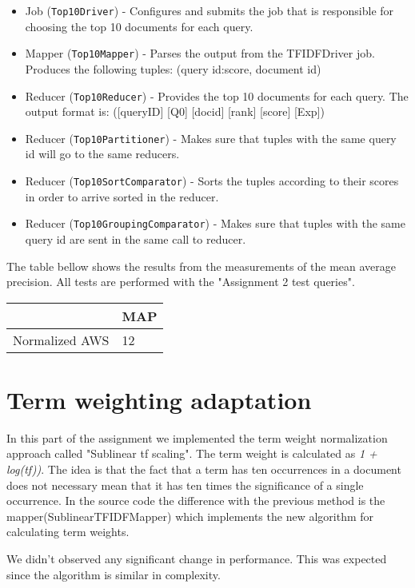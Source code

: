 \documentclass[a4paper, notitlepage]{article}
\begin{document}
\begin{itemize}
	\item Job (\lstinline{Top10Driver}) - Configures and submits the job that is responsible for choosing the top 10 documents for each query.
	\item Mapper (\lstinline{Top10Mapper}) - Parses the output from the TFIDFDriver job. Produces the following tuples: (query id:score, document id)
	\item Reducer (\lstinline{Top10Reducer}) - Provides the top 10 documents for each query. The output format is: ([queryID] [Q0] [docid] [rank] [score] [Exp])
  
	\item Reducer (\lstinline{Top10Partitioner}) - Makes sure that tuples with the same query id will go to the same reducers.
	
	\item Reducer (\lstinline{Top10SortComparator}) - Sorts the tuples according to their scores in order to arrive sorted in the reducer.
	
	\item Reducer (\lstinline{Top10GroupingComparator}) - Makes sure that tuples with the same query id are sent in the same call to reducer.
	
\end{itemize}

The table bellow shows the results from the measurements of the mean average precision. All tests are performed with the "Assignment 2 test queries".
\begin{center}
	\begin{tabular}{ | l | l | }
    	\hline
     & MAP\\ \hline
    Normalized AWS & 12  \\ \hline
    \hline
    \end{tabular}
\end{center}

\section{Term weighting adaptation}
In this part of the assignment we implemented the term weight normalization approach called "Sublinear tf scaling". The term weight is calculated as \emph{1 + log(tf))}. The idea is that the fact that a term has ten occurrences in a document does not necessary mean that it has ten times the significance of a single occurrence. In the source code the difference with the previous method is the mapper(SublinearTFIDFMapper) which implements the new algorithm for calculating term weights.

We didn't observed any significant change in performance. This was expected since the algorithm is similar in complexity.
\end{document}
